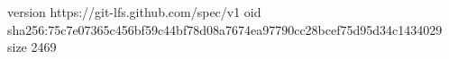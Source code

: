version https://git-lfs.github.com/spec/v1
oid sha256:75c7e07365c456bf59c44bf78d08a7674ea97790cc28bcef75d95d34c1434029
size 2469
